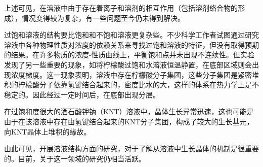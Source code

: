 上述可见，在溶液中由于存在着离子和溶剂的相互作用（包括溶剂络合物的形成），情况变得较为复杂，有一些问题至今仍未得到解决。

过饱和溶液的结构要比饱和和不饱和溶液更复杂些。不少科学工作者试图通过研究溶液中各种物理性质对浓度的依赖关系来寻找过饱和溶液的特征，但没有取得预期的结果。在许多物质的浓度-性质曲线上，平衡饱和点并未出现不连续性。但实验发现了另一些重要的现象，如将柠檬酸过饱和水溶液恒温静置，在底部区域则会出现浓度梯度。这一现象表明，溶液中存在柠檬酸分子集团，这些分子集团是紧密堆积的柠檬酸分子依靠氢键结合起来的，密度比水的大，这样的体系在热力学上是不稳定的。因此经过一定时间后，在底部出现分层。

在过饱和度很大的酒石酸钾钠（KNT）溶液中，晶体生长异常迅速，这也可能是由于在该溶液中存在由氢键结合起来的KNT分子集团，构成了较大的生长基元，向KNT晶体上堆积的缘故。 

由此可见，开展溶液结构方面的研究，对于了解从溶液中生长晶体的机制是很重要的。目前，关于这一领域的研究仍相当活跃。